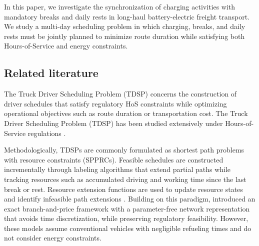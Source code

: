 \documentclass[3p,11pt,authoryear]{elsarticle}  %
\begin{document}
In this paper, we investigate the synchronization of charging activities with mandatory breaks and daily rests in long-haul battery-electric freight transport. We study a multi-day scheduling problem in which charging, breaks, and daily rests must be jointly planned to minimize route duration while satisfying both Hours-of-Service and energy constraints.

\subsection{Related literature}

The Truck Driver Scheduling Problem (TDSP) concerns the construction of driver schedules that satisfy regulatory HoS constraints while optimizing operational objectives such as route duration or transportation cost. The Truck Driver Scheduling Problem (TDSP) has been studied extensively under Hours-of-Service regulations \citep{archetti2009trip, goel2012minimum, goel2012truck}. %

Methodologically, TDSPs are commonly formulated as shortest path problems with resource constraints (SPPRCs). Feasible schedules are constructed incrementally through labeling algorithms that extend partial paths while tracking resources such as accumulated driving and working time since the last break or rest. Resource extension functions are used to update resource states and identify infeasible path extensions \citep{goel2010truck, drexl2010labelling}. Building on this paradigm, \citet{goel2017exact} introduced an exact branch-and-price framework with a parameter-free network representation that avoids time discretization, while preserving regulatory feasibility. However, these models assume conventional vehicles with negligible refueling times and do not consider energy constraints.
\end{document}
